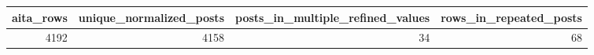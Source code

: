 \begin{tabular}{rrrr}
\toprule
aita\_rows & unique\_normalized\_posts & posts\_in\_multiple\_refined\_values & rows\_in\_repeated\_posts \\
\midrule
4192 & 4158 & 34 & 68 \\
\bottomrule
\end{tabular}
